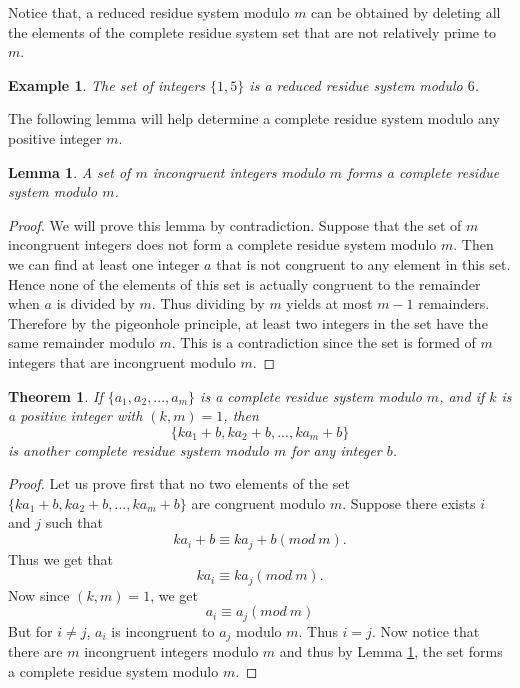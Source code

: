 \documentclass[12pt,letterpaper]{book}
\newtheorem{theorem}{Theorem}
\newtheorem{lemma}{Lemma}
\newtheorem{example}{Example}
\begin{document}
Notice that, a reduced residue system modulo $m$ can be obtained by
deleting all the elements of the complete residue system set that
are not relatively prime to $m$.

\begin{example}
The set of integers $\{1,5\}$ is a reduced residue system modulo
$6$.
\end{example}

The following lemma will help determine a complete residue system
modulo any positive integer $m$. 
\begin{lemma}\label{ResidueLemma}
A set of $m$ incongruent integers modulo $m$ forms a complete
residue system modulo $m$.
\end{lemma}

\begin{proof}
We will prove this lemma by contradiction.  Suppose that the set of
$m$ incongruent integers does not form a complete residue system modulo $m$.
Then we can find at least one integer $a$ that is not congruent to
any element in this set. Hence none of the elements of this set is
actually congruent to the remainder when $a$ is divided by $m$. Thus
dividing by $m$ yields at most $m-1$ remainders. Therefore by the
pigeonhole principle, at least two integers in the set have the
same remainder modulo $m$. This is a contradiction since the set 
is formed of $m$ integers that are incongruent modulo $m$.
\end{proof}


\begin{theorem}\label{ResSysThm1}
If $\{a_1, a_2,...,a_m\}$ is a complete residue system modulo $m$, and
if $k$ is a positive integer with $(k,m)=1$, then
\begin{equation*}
\{ka_1+b, ka_2+b,...,ka_m+b\}
\end{equation*}
is another complete residue system modulo $m$ for any integer $b$.
\end{theorem}

\begin{proof}
Let us prove first that no two elements of the set\\ $\{ka_1+b,
ka_2+b,...,ka_m+b\}$ are congruent modulo $m$.  Suppose there exists
$i$ and $j$ such that
\begin{equation*}
ka_i+b\equiv ka_j+b(mod\ m).
\end{equation*}
Thus we get that
\begin{equation*}
ka_i\equiv ka_j(mod \ m).
\end{equation*}
Now since $(k,m)=1$, we get
\begin{equation*}
a_i\equiv a_j(mod\ m)
\end{equation*}
But for $i\neq j$, $a_i$ is incongruent to $a_j$ modulo $m$. Thus
$i=j$. Now notice that there are $m$ incongruent integers modulo $m$
and thus by Lemma \ref{ResidueLemma}, the set forms a complete residue system modulo
$m$.
\end{proof}
\end{document}
